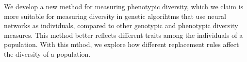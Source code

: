 We develop a new method for measuring phenotypic diversity, which we claim is more suitable for measuring diversity in genetic algorihtms that use neural networks as individuals, compared to other genotypic and phenotypic diversity measures. This method better reflects different traits among the individuals of a population. With this mthod, we explore how different replacement rules affect the diversity of a population. 
